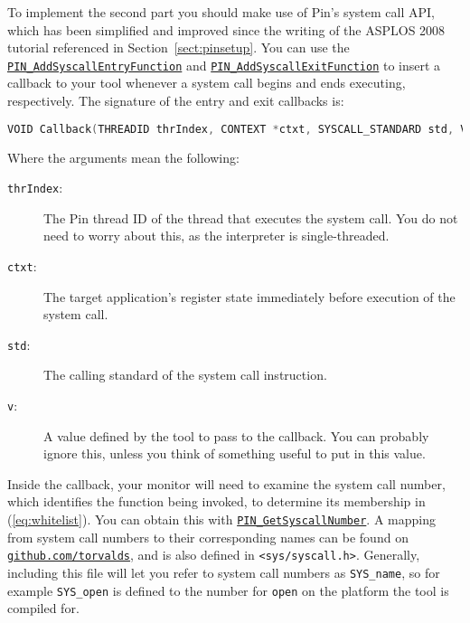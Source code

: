 \documentclass[11pt]{article}
\begin{document}
To implement the second part you should make use of Pin's system call API, which has been simplified and improved since the writing of the ASPLOS 2008 tutorial referenced in Section~\ref{sect:pinsetup}. You can use the \href{https://software.intel.com/sites/landingpage/pintool/docs/81205/Pin/html/group__PIN__SYSCALL__API.html#gb62f4c93284ca4219f53aa9c4ab4d545}{\texttt{PIN\_AddSyscallEntryFunction}} and \href{https://software.intel.com/sites/landingpage/pintool/docs/81205/Pin/html/group__PIN__SYSCALL__API.html#g8bf568a9177431df0939d478de94bb51}{\texttt{PIN\_AddSyscallExitFunction}} to insert a callback to your tool whenever a system call begins and ends executing, respectively. The signature of the entry and exit callbacks is:
\begin{lstlisting}[basicstyle=\footnotesize\ttfamily,language=C,keywordstyle=\bfseries\color{green!40!black}, commentstyle=\itshape\color{purple!40!black},stringstyle=\color{orange}]
VOID Callback(THREADID thrIndex, CONTEXT *ctxt, SYSCALL_STANDARD std, VOID *v)
\end{lstlisting}
Where the arguments mean the following:
\begin{description}
\item[\texttt{thrIndex}:] The Pin thread ID of the thread that executes the system call. You do not need to worry about this, as the interpreter is single-threaded.
\item[\texttt{ctxt}:] The target application's register state immediately before execution of the system call.
\item[\texttt{std}:] The calling standard of the system call instruction.
\item[\texttt{v}:] A value defined by the tool to pass to the callback. You can probably ignore this, unless you think of something useful to put in this value.
\end{description}
Inside the callback, your monitor will need to examine the system call number, which identifies the function being invoked, to determine its membership in (\ref{eq:whitelist}). You can obtain this with \href{https://software.intel.com/sites/landingpage/pintool/docs/81205/Pin/html/group__PIN__SYSCALL__API.html#g441fc7c57ea2f00024e35c8360af6b0d}{\texttt{PIN\_GetSyscallNumber}}. A mapping from system call numbers to their corresponding names can be found on \href{https://github.com/torvalds/linux/blob/master/arch/x86/entry/syscalls/syscall_64.tbl}{\texttt{github.com/torvalds}}, and is also defined in \verb'<sys/syscall.h>'. Generally, including this file will let you refer to system call numbers as \verb'SYS_name', so for example \verb'SYS_open' is defined to the number for \verb'open' on the platform the tool is compiled for.
\end{document}
